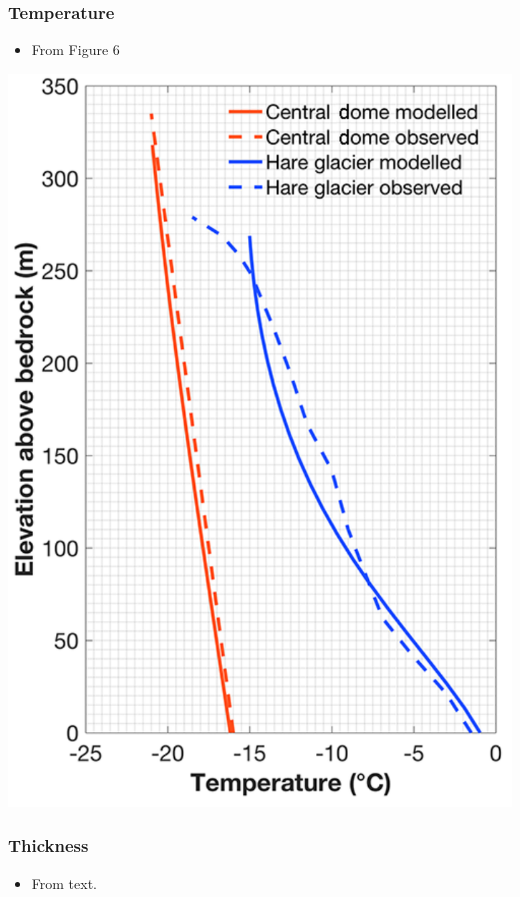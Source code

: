 \documentclass[article,a4paper,times,11pt,twoside]{article}
\begin{document}
\subsubsection{Temperature}
\label{sec:org24d99eb}

\begin{itemize}
\item From \textcite{zekollari_2017} Figure 6
\end{itemize}
\begin{center}
\includegraphics[width=.9\linewidth]{hanstausen_dome/zekollari_2017_fig6.png}
\end{center}

\subsubsection{Thickness}
\label{sec:org095686a}

\begin{itemize}
\item From \textcite{zekollari_2017} text.
\end{itemize}
\end{document}
